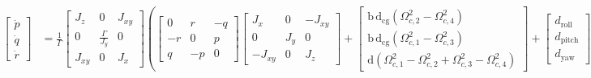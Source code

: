 \documentclass[3p]{elsarticle}
\begin{document}
\begin{align*}
    \begin{bmatrix}
        \dot{p} \\
        \dot{q} \\
        \dot{r}
    \end{bmatrix} &= \frac{1}{\Gamma} \begin{bmatrix}
        J_z & 0 & J_{xy} \\
        0 & \frac{\Gamma}{J_y} & 0 \\
        J_{xy} & 0 & J_x
    \end{bmatrix} \left(
        \begin{bmatrix}
            0 & r & -q \\
            -r & 0 & p \\
            q & -p & 0
        \end{bmatrix} \begin{bmatrix}
            J_x & 0 & -J_{xy} \\
            0 & J_y & 0 \\
            -J_{xy} & 0 & J_z
        \end{bmatrix} +
        \begin{bmatrix}
            \mathrm{b\,d}_{\text{cg}} (\Omega_{c, 2}^2 - \Omega_{c, 4}^2) \\
            \mathrm{b\,d}_{\text{cg}} (\Omega_{c, 1}^2 - \Omega_{c, 3}^2) \\
            \mathrm{d} (\Omega_{c, 1}^2 - \Omega_{c, 2}^2 + \Omega_{c, 3}^2 - \Omega_{c, 4}^2)
        \end{bmatrix} +
        \begin{bmatrix}
            d_{\text{roll}} \\
            d_{\text{pitch}} \\
            d_{\text{yaw}}
        \end{bmatrix}
    \right)
\end{align*}
\end{document}
